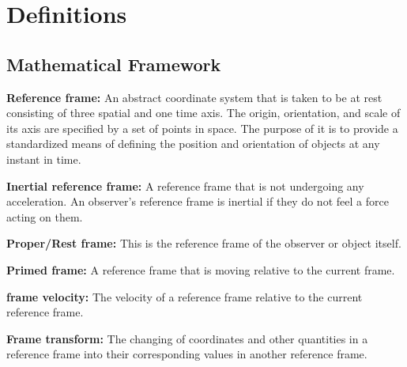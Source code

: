 
\section{Definitions}

\subsection{Mathematical Framework}%

\linesep

\noindent \hypertarget{def-Reference-frame}{\textbf{Reference frame:}}
An abstract coordinate system that is taken to be at rest consisting of three spatial and one time axis. The origin, orientation, and scale of its axis are specified by a set of points in space. The purpose of it is to provide a standardized means of defining the position and orientation of objects at any instant in time.

\linesep

\noindent \hypertarget{def-Inertial-reference-frame}{\textbf{Inertial reference frame:}}
A reference frame that is not undergoing any acceleration. An observer's reference frame is inertial if they do not feel a force acting on them.

\linesep

\noindent \hypertarget{def-proper-frame}{\textbf{Proper/Rest frame:}}
This is the reference frame of the observer or object itself.

\linesep


\noindent \hypertarget{def-Primed-Frame}{\textbf{Primed frame:}}
A reference frame that is moving relative to the current frame.

\linesep

\noindent \hypertarget{def-frame-velocity}{\textbf{frame velocity:}}
The velocity of a reference frame relative to the current reference frame.

\linesep

\noindent \hypertarget{def-transform}{\textbf{Frame transform:}}
The changing of coordinates and other quantities in a reference frame into their corresponding values in another reference frame.


